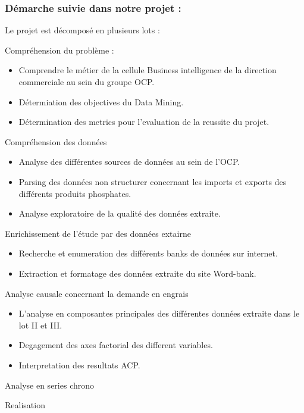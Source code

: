 	\subsubsection{Démarche suivie dans notre projet :}
	Le projet est décomposé en plusieurs lots :
	\begin{description}[align=left]
		\item[Lot I :] Compréhension du problème :
						\begin{itemize}
							\item Comprendre le métier de la cellule Business intelligence de la direction commerciale au sein du groupe OCP.
							\item Détermiation des objectives du Data Mining.
							\item Détermination des metrics pour l'evaluation de la reussite du projet.
					   	\end{itemize}
		\item[Lot II :] Compréhension des données
						\begin{itemize}
							\item Analyse des différentes sources de données au sein de l'OCP.
							\item Parsing des données non structurer concernant les imports et exports des différents produits phosphates.
							\item Analyse exploratoire de la qualité des données extraite.
						\end{itemize}		 %
		\item[Lot III :] Enrichissement de l'étude par des données extairne
						\begin{itemize}
							\item Recherche et enumeration des différents banks de données sur internet.
							\item Extraction et formatage des données extraite du site Word-bank.
						\end{itemize} %
		\item[Lot IV :] Analyse causale concernant la demande en engrais
						\begin{itemize}
							\item L'analyse en composantes principales des différentes données extraite dans le lot II et III.
							\item Degagement des axes factorial des different variables.
							\item Interpretation des resultats ACP.
						\end{itemize} %
		\item[Lot V :] Analyse en series chrono
		\item[Lot VI :] Realisation
	\end{description}
